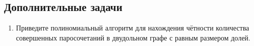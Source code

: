 \subsection*{Дополнительные задачи}
\begin{enumerate}
	\item Приведите полиномиальный алгоритм для нахождения чётности количества совершенных паросочетаний в 
	двудольном графе с равным размером долей.
\end{enumerate}